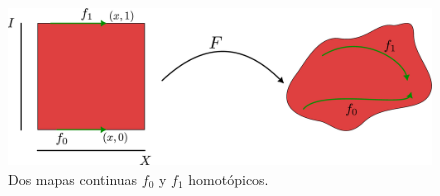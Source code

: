 \begin{figure}[h]
    \centering
    \includegraphics[scale=0.2]{Figures/homotopia.eps}
    \caption{Dos mapas continuas $f_0$ y $f_1$ homot\'opicos.}
    \label{fig_13}
\end{figure}
